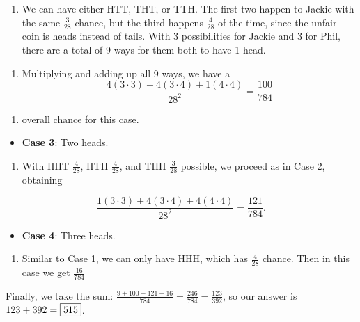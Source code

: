 \begin{enumerate}
            \begin{enumerate}[label=(\roman*)]
                \item We can have either HTT, THT, or TTH. The first two happen to Jackie with the same $\frac {3}{28}$ chance, but the third happens $\frac {4}{28}$ of the time, since the unfair coin is heads instead of tails. With 3 possibilities for Jackie and 3 for Phil, there are a total of 9 ways for them both to have 1 head.
            \end{enumerate}
            
            \begin{enumerate}[label=(\roman*)]
                \item Multiplying and adding up all 9 ways, we have a 
 \[\frac {4(3 \cdot 3) + 4(3 \cdot 4) + 1(4 \cdot 4)}{28^{2}} = \frac {100}{784}\]
            \end{enumerate}
            
            \begin{enumerate}[label=(\roman*)]
                \item overall chance for this case.
            \end{enumerate}
            
            \begin{itemize}
        \item \textbf{Case 3}: Two heads.
            \end{itemize}
            
            \begin{enumerate}[label=(\roman*)]
                \item With HHT $\frac {4}{28}$, HTH $\frac {4}{28}$, and THH $\frac {3}{28}$ possible, we proceed as in Case 2, obtaining
            \end{enumerate}
            
 \[\frac {1(3 \cdot 3) + 4(3 \cdot 4) + 4(4 \cdot 4)}{28^{2}} = \frac {121}{784}.\]

            \begin{itemize}
        \item \textbf{Case 4}: Three heads.
            \end{itemize}
            
            \begin{enumerate}[label=(\roman*)]
                \item Similar to Case 1, we can only have HHH, which has $\frac {4}{28}$ chance. Then in this case we get $\frac {16}{784}$
            \end{enumerate}
            Finally, we take the sum: $\frac {9 + 100 + 121 + 16}{784} = \frac {246}{784} = \frac {123}{392}$, so our answer is $123 + 392 = \fbox{515}$.


\end{enumerate}
